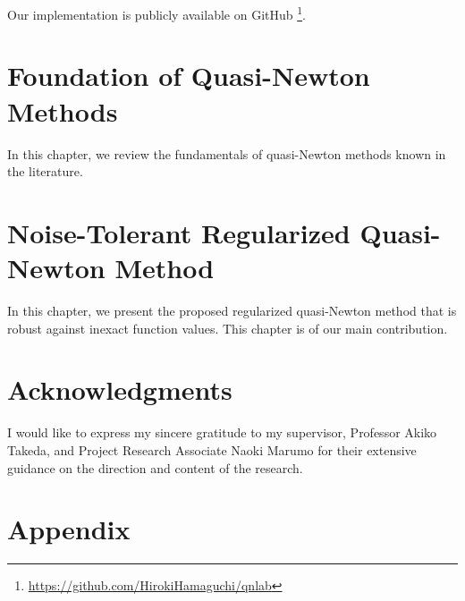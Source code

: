 \documentclass[uplatex,english,suri,master]{suribt}
\begin{document}
Our implementation is publicly available on GitHub%
\footnote{\label{fn:ourGitHub}\url{https://github.com/HirokiHamaguchi/qnlab}}.

\chapter{Foundation of Quasi-Newton Methods}\label{chap:background}

In this chapter, we review the fundamentals of quasi-Newton methods known in the literature.









\chapter{Noise-Tolerant Regularized Quasi-Newton Method}
\label{chap:main}

In this chapter, we present the proposed regularized quasi-Newton method that is robust against inexact function values.
This chapter is of our main contribution.

\newcommand{\myQED}{}


\backmatter%
\chapter{Acknowledgments}%

I would like to express my sincere gratitude to my supervisor, Professor Akiko Takeda, and Project Research Associate Naoki Marumo for their extensive guidance on the direction and content of the research.




\appendix%

\chapter{Appendix}


\end{document}
